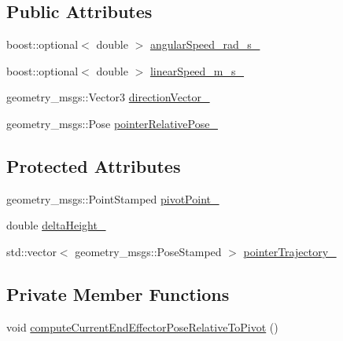 \subsection*{Public Attributes}
\begin{DoxyCompactItemize}
\item 
boost\+::optional$<$ double $>$ \hyperlink{classcl__move__group__interface_1_1CbCircularPouringMotion_a7f69b3f95281fc14902117d637b59972}{angular\+Speed\+\_\+rad\+\_\+s\+\_\+}
\item 
boost\+::optional$<$ double $>$ \hyperlink{classcl__move__group__interface_1_1CbCircularPouringMotion_ac78ce543451cbb78c95862dd4273deb7}{linear\+Speed\+\_\+m\+\_\+s\+\_\+}
\item 
geometry\+\_\+msgs\+::\+Vector3 \hyperlink{classcl__move__group__interface_1_1CbCircularPouringMotion_a4c2cc7f70981981a723818039450cfe8}{direction\+Vector\+\_\+}
\item 
geometry\+\_\+msgs\+::\+Pose \hyperlink{classcl__move__group__interface_1_1CbCircularPouringMotion_a5ebef44cab4cb3dec5148232ef0eb2f8}{pointer\+Relative\+Pose\+\_\+}
\end{DoxyCompactItemize}
\subsection*{Protected Attributes}
\begin{DoxyCompactItemize}
\item 
geometry\+\_\+msgs\+::\+Point\+Stamped \hyperlink{classcl__move__group__interface_1_1CbCircularPouringMotion_a4c100d8ba3e57f7ddfb614017d115fca}{pivot\+Point\+\_\+}
\item 
double \hyperlink{classcl__move__group__interface_1_1CbCircularPouringMotion_a7009d617bcd8ac1fba49100444434f3c}{delta\+Height\+\_\+}
\item 
std\+::vector$<$ geometry\+\_\+msgs\+::\+Pose\+Stamped $>$ \hyperlink{classcl__move__group__interface_1_1CbCircularPouringMotion_a6f53442c47cf9280d8be72ea1c35546f}{pointer\+Trajectory\+\_\+}
\end{DoxyCompactItemize}
\subsection*{Private Member Functions}
\begin{DoxyCompactItemize}
\item 
void \hyperlink{classcl__move__group__interface_1_1CbCircularPouringMotion_a4986b396e0ba318a0046feea3f6eede6}{compute\+Current\+End\+Effector\+Pose\+Relative\+To\+Pivot} ()
\end{DoxyCompactItemize}

